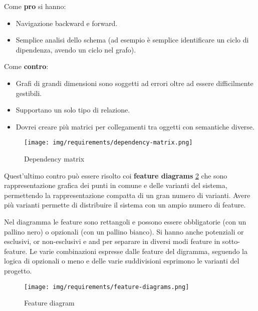 Come \textbf{pro} si hanno:
\begin{itemize}
      \item Navigazione backward e forward.
      \item Semplice analisi dello schema (ad esempio è semplice identificare un
            ciclo di dipendenza, avendo un ciclo nel grafo).
\end{itemize}

Come \textbf{contro}:
\begin{itemize}
      \item Grafi di grandi dimensioni sono soggetti ad errori oltre ad essere
            difficilmente gestibili.
      \item Supportano un solo tipo di relazione.
      \item Dovrei creare più matrici per collegamenti tra oggetti con semantiche
            diverse.
\end{itemize}
\begin{figure}[!ht]
      \centering
      \texttt{[image: img/requirements/dependency-matrix.png]}
      \caption{Dependency matrix}
      \label{fig:dependency-matrix}
\end{figure}
Quest'ultimo contro può essere risolto coi \textbf{feature diagrams}
\ref{fig:feature-diagram} che sono rappresentazione grafica dei punti in comune
e delle varianti del sistema, permettendo la rappresentazione compatta di un
gran numero di varianti. Avere più varianti permette di distribuire il sistema
con un ampio numero di feature.

Nel diagramma le feature sono rettangoli e possono essere obbligatorie (con un
pallino nero) o opzionali (con un pallino bianco). Si hanno anche potenziali or
esclusivi, or non-esclusivi e and per separare in diversi modi feature in
sotto-feature. Le varie combinazioni espresse dalle feature del digramma, seguendo
la logica di opzionali o meno e delle varie suddivisioni esprimono le varianti
del progetto.
\begin{figure}[!ht]
      \centering
      \texttt{[image: img/requirements/feature-diagrams.png]}
      \caption{Feature diagram}
      \label{fig:feature-diagram}
\end{figure}